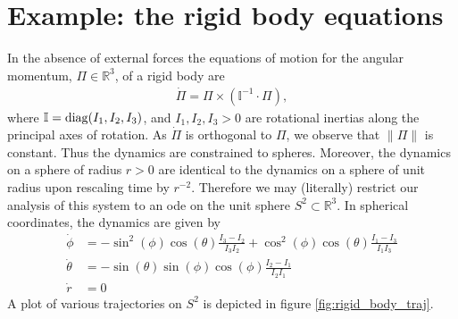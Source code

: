 \documentclass[letterpaper, 12 pt]{amsart}
\newcommand{\R}{\mathbb{R}}
\begin{document}
%
%
%
%

\section{Example: the rigid body equations}
In the absence of external forces
the equations of motion for the angular momentum, $\Pi \in \R^3$,
of a rigid body are
\begin{align}
  \dot{\Pi} = \Pi \times ( \mathbb{I}^{-1}\cdot \Pi),  \label{eq:rigid_body}
\end{align}
where $\mathbb{I} = {\rm diag}(I_1,I_2,I_3)$,
and $I_1,I_2,I_3 > 0$ are rotational inertias along
the principal axes of rotation.
As $\dot{\Pi}$ is orthogonal to $\Pi$, we observe that
$\| \Pi \|$ is constant.  Thus the dynamics are constrained
to spheres.  Moreover, the dynamics on a sphere of radius $r>0$
are identical to the dynamics on a sphere of unit radius
upon rescaling time by $r^{-2}$.
Therefore we may (literally) restrict our analysis of this system
to an ode on the unit sphere $S^2 \subset \R^3$.
In spherical coordinates, the dynamics are given by
\begin{align*}
  \dot{\phi} &= -\sin^2(\phi) \cos(\theta) \frac{I_3-I_2}{I_3I_2}
  + \cos^2(\phi) \cos(\theta) \frac{I_1 - I_3}{I_1 I_3} \\
  \dot{\theta} &= - \sin(\theta) \sin(\phi) \cos(\phi) \frac{I_2 - I_1}{I_2I_1} \\
  \dot{r} &= 0
\end{align*}
A plot of various trajectories on $S^2$ is depicted in figure \ref{fig:rigid_body_traj}.
\end{document}
